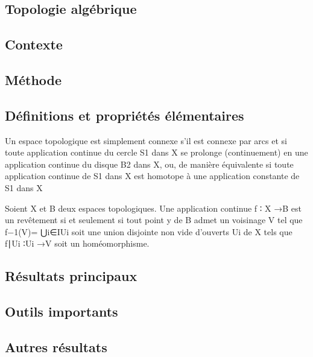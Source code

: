 \documentclass[11pt,a4paper]{article}
\begin{document}
\newpage
\begin{center}  
\section*{Topologie algébrique} 
\end{center}



\subsection*{Contexte}

\subsection*{Méthode}

\subsection*{Définitions et propriétés élémentaires}

Un espace topologique est simplement connexe s’il est connexe par arcs et si toute
application continue du cercle S1 dans X se prolonge (continuement) en une application
continue du disque B2 dans X, ou, de manière équivalente si toute application continue de
S1 dans X est homotope à une application constante de S1 dans X

Soient X et B deux espaces topologiques. Une application continue
f ∶ X →B est un revêtement si et seulement si tout point y de B admet un voisinage
V tel que f−1(V)= ⋃i∈IUi soit une union disjointe non vide d’ouverts Ui de X tels que
f∣Ui
∶Ui →V soit un homéomorphisme.

\subsection*{Résultats principaux}

\subsection*{Outils importants}


\subsection*{Autres résultats}
\end{document}
